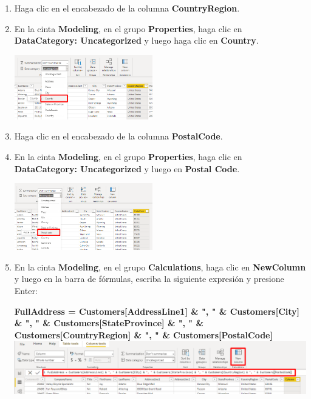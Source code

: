 \documentclass[12pt,letterpaper]{article}
\newcommand\tab[1][1cm]{\hspace*{#1}}
\begin{document}
\begin{enumerate}[\tab 1.]
\begin{center}
        \end{center}
        \item Haga clic en el encabezado de la columna \textbf{CountryRegion}.
        \item En la cinta \textbf{Modeling}, en el grupo \textbf{Properties}, haga clic en \textbf{DataCategory: Uncategorized} y luego haga clic en \textbf{Country}.
        \begin{center}
            \includegraphics[width=6cm]{./img/img31.png}
        \end{center}
        \item Haga clic en el encabezado de la columna \textbf{PostalCode}.
        \item En la cinta \textbf{Modeling}, en el grupo \textbf{Properties}, haga clic en \textbf{DataCategory: Uncategorized} y luego en \textbf{Postal Code}.
        \begin{center}
            \includegraphics[width=6cm]{./img/img33.png}
        \end{center}
        \item En la cinta \textbf{Modeling}, en el grupo \textbf{Calculations}, haga clic en \textbf{NewColumn} y luego en la barra de fórmulas, escriba la siguiente expresión y presione Enter:
        \begin{center}
            \textbf{FullAddress = Customers[AddressLine1] \& ", " \& Customers[City] \& ", " \& Customers[StateProvince] \& ", " \& Customers[CountryRegion] \& ", " \& Customers[PostalCode]}
            \includegraphics[width=13cm]{./img/img34.png}
        \end{center}

\end{enumerate}
\end{document}
